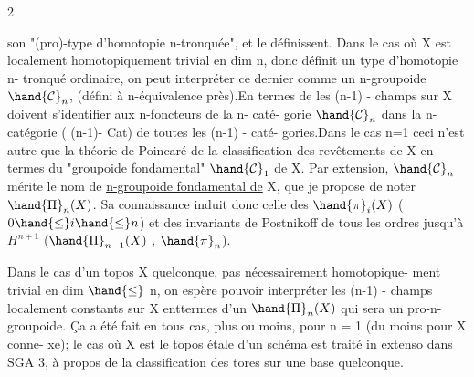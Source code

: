  \hfill 2

son "(pro)-type d'homotopie n-tronquée", et le définissent.  Dans le  cas
où  X est localement homotopiquement trivial en dim \hand{$\unsure{\leq}$} n, donc définit un
type d'homotopie  n- tronqué ordinaire, on peut interpréter ce dernier comme
 un n-groupoide  $\hand{\mathcal{C}}_{n}$, (défini à n-équivalence près).En termes de \hand{,}
les (n-1) - champs  sur X doivent s'identifier aux n-foncteurs de la n- caté-%
gorie  $\hand{\mathcal{C}}_{n}$  dans  la n-catégorie   ( (n-1)- Cat)  de toutes les (n-1) - caté-%
gories.Dans le cas n=1  ceci n'est autre que la théorie  de Poincaré  de la
classification des revêtements de X en termes du "groupoide fondamental" $\hand{\mathcal{C}}_{1}$
de X.  Par extension, $\hand{\mathcal{C}}_{n}$  mérite le nom de  \uline{n-groupoide fondamental  de}
X, que je propose de noter $\hand{\Pi}_{n}(X)$.  Sa connaissance induit donc celle
des  $\hand{\pi}_{i}(X)$  ($0 \hand{\leq} i \hand{\leq} n$)  et des invariants de Postnikoff  de tous les
ordres jusqu'à  $H^{n+1}$  ($\hand{\Pi}_{n-1}(X)$ , $\hand{\pi}_{n}$).

Dans le cas d'un topos X quelconque, pas nécessairement  homotopique-%
ment trivial en dim $\hand{\leq}$ n,  on espère pouvoir interpréter les (n-1) - champs
localement constants sur X   enttermes d'un $\hand{\Pi}_{n}(X)$  qui sera un  pro-n-groupoide.
Ça  a été fait en tous cas, plus ou moins, pour n = 1  (du moins pour X conne-%
xe);  le cas où  X est le topos étale d'un schéma  est traité  in extenso
dans SGA 3, à propos de la classification des tores sur une base quelconque.

